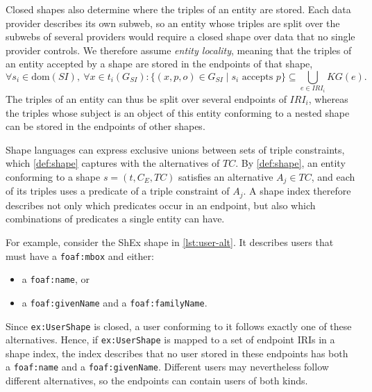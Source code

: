 Closed shapes also determine where the triples of an entity are stored.
Each data provider describes its own subweb,
so an entity whose triples are split over the subwebs of several providers would require a closed shape over data that no single provider controls.
We therefore assume \emph{entity locality}, meaning that the triples of an entity accepted by a shape are stored in the endpoints of that shape,
\begin{equation}\label{eq:locality}
  \forall s_i \in \mathrm{dom}(SI),\ \forall x \in t_i(G_{SI}) :
  \{ (x, p, o) \in G_{SI} \mid s_i \text{ accepts } p \} \subseteq \bigcup_{e \in \mathit{IRI}_i} \mathit{KG}(e).
\end{equation}
The triples of an entity can thus be split over several endpoints of $\mathit{IRI}_i$,
whereas the triples whose subject is an object of this entity conforming to a nested shape can be stored in the endpoints of other shapes.

Shape languages can express exclusive unions between sets of triple constraints, which \cref{def:shape} captures with the alternatives of $\mathit{TC}$.
By \cref{def:shape}, an entity conforming to a shape $s = (t, C_E, \mathit{TC})$ satisfies an alternative $A_j \in \mathit{TC}$,
and each of its triples uses a predicate of a triple constraint of $A_j$.
A shape index therefore describes not only which predicates occur in an endpoint, but also which combinations of predicates a single entity can have.



For example, consider the ShEx shape in \cref{lst:user-alt}.
It describes users that must have a \texttt{foaf:mbox} and either:
\begin{itemize}
  \item a \texttt{foaf:name}, or
  \item a \texttt{foaf:givenName} and a \texttt{foaf:familyName}.
\end{itemize}

Since \texttt{ex:UserShape} is closed, a user conforming to it follows exactly one of these alternatives.
Hence, if \texttt{ex:UserShape} is mapped to a set of endpoint \acp{IRI} in a shape index, the index describes that no user stored in these endpoints has both a \texttt{foaf:name} and a \texttt{foaf:givenName}.
Different users may nevertheless follow different alternatives, so the endpoints can contain users of both kinds.

